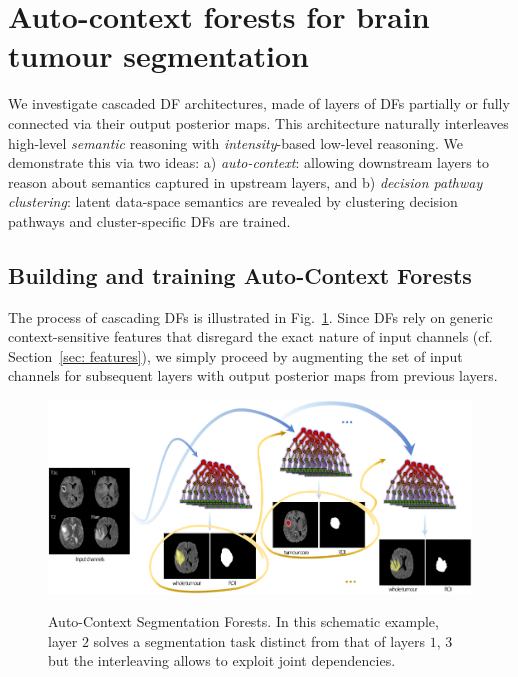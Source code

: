 
\section{Auto-context forests for brain tumour segmentation}
\label{sec: cascading}

We investigate cascaded DF architectures, made of layers of DFs partially or fully connected via their output posterior maps. 
This architecture naturally interleaves high-level \textit{semantic} reasoning with \textit{intensity}-based low-level 
reasoning. We demonstrate this via two ideas: a) \textit{auto-context}: allowing downstream layers to reason about 
semantics captured in upstream layers, and b) \textit{decision pathway clustering}: latent data-space semantics are 
revealed by clustering decision pathways and cluster-specific DFs are trained. 

\subsection{Building and training Auto-Context Forests}

The process of cascading DFs is illustrated in Fig.~\ref{fig: DN concept}. Since DFs rely on generic context-sensitive features %
that disregard the exact nature of input channels (cf. Section~\ref{sec: features}), we simply proceed by augmenting the set of input channels for subsequent layers with output posterior maps from previous layers. %

\begin{figure}
\centering
\includegraphics[width=1\columnwidth]{images/DecisionNetwork-BRATS.png}
\label{fig: DN concept}
\caption{Auto-Context Segmentation Forests. In this schematic example, layer $2$ solves a segmentation task distinct from that of layers $1$, $3$ but the interleaving allows to exploit joint dependencies.}
\end{figure}

